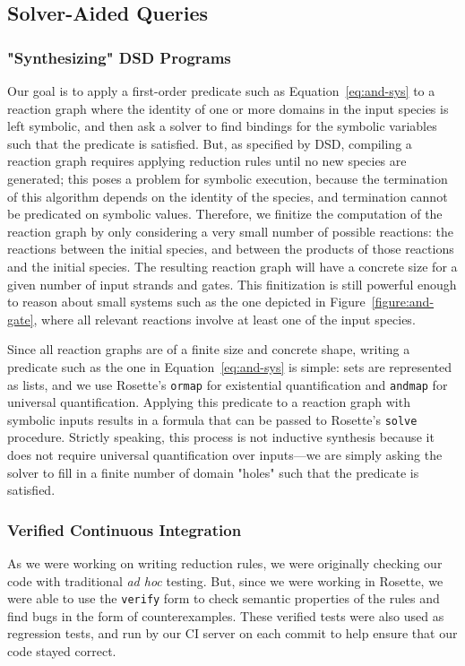 \documentclass{article}[10pt]
\begin{document}
\subsection{Solver-Aided Queries}
\subsubsection{"Synthesizing" DSD Programs}
Our goal is to apply a first-order predicate such as Equation~\ref{eq:and-sys}
to a reaction graph where the identity of one or more domains in the input
species is left symbolic, and then ask a solver to find bindings for the
symbolic variables such that the predicate is satisfied. But,
as specified by DSD, compiling a reaction graph requires applying
reduction rules until no new species are generated; this poses a problem
for symbolic execution, because the termination of this algorithm
depends on the identity of the species, and termination cannot be
predicated on symbolic values. Therefore, we finitize the computation
of the reaction graph by only considering a very small number of possible
reactions: the reactions between the initial species, and between
the products of those reactions and the initial species. The
resulting reaction graph will have a concrete size for a given
number of input strands and gates. This finitization
is still powerful enough to reason about small systems such as the one
depicted in Figure~\ref{figure:and-gate}, where all relevant reactions
involve at least one of the input species.

Since all reaction graphs are of a finite size and concrete shape,
writing a predicate such as the one in Equation~\ref{eq:and-sys} is
simple: sets are represented as lists, and we use Rosette's \verb;ormap; for
existential quantification and \verb;andmap; for universal quantification.
Applying this predicate to a reaction graph with symbolic inputs results
in a formula that can be passed to Rosette's \verb;solve; procedure.
Strictly speaking, this process is not inductive synthesis because it
does not require universal quantification over inputs---we are simply
asking the solver to fill in a finite number of domain "holes" such that the
predicate is satisfied.

\subsubsection{Verified Continuous Integration}
As we were working on writing reduction rules, we were originally
checking our code with traditional \emph{ad hoc} testing. But,
since we were working in Rosette, we were able to use the \verb;verify;
form to check semantic properties of the rules and find bugs in the
form of counterexamples. These verified tests were also used as regression
tests, and run by our CI server on each commit to help ensure that our code
stayed correct.
\end{document}
